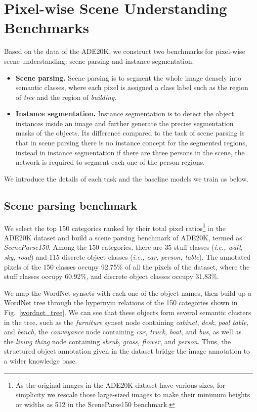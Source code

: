 \section{Pixel-wise Scene Understanding Benchmarks}
\label{section:benchmarks}
Based on the data of the ADE20K, we construct two benchmarks for pixel-wise scene understanding: scene parsing and instance segmentation:

\begin{itemize}
\item \textbf{Scene parsing.} Scene parsing is to segment the whole image densely into semantic classes, where each pixel is assigned a class label such as the region of \textit{tree} and the region of \textit{building}. 

\item \textbf{Instance segmentation.} Instance segmentation is to detect the object instances inside an image and further generate the precise segmentation masks of the objects. Its difference compared to the task of scene parsing is that in scene parsing there is no instance concept for the segmented regions, instead in instance segmentation if there are three persons in the scene, the network is required to segment each one of the person regions.
\end{itemize}

We introduce the details of each task and the baseline models we train as below.

\subsection{Scene parsing benchmark}

We select the top 150 categories ranked by their total pixel ratios\footnote{As the original images in the ADE20K dataset have various sizes, for simplicity we rescale those large-sized images to make their minimum heights or widths as 512 in the SceneParse150 benchmark.} in the ADE20K dataset and build a scene parsing benchmark of ADE20K, termed as \textit{SceneParse150}. Among the 150 categories, there are 35 stuff classes (\textit{i.e., wall, sky, road}) and 115 discrete object classes (\textit{i.e., car, person, table}). The annotated pixels of the 150 classes occupy 92.75\% of all the pixels of the dataset, where the stuff classes occupy 60.92\%, and discrete object classes occupy 31.83\%.

We map the WordNet synsets with each one of the object names, then build up a WordNet tree through the hypernym relations of the 150 categories shown in Fig.~\ref{wordnet_tree}. We can see that these objects form several semantic clusters in the tree, such as the \textit{furniture} synset node containing \textit{cabinet}, \textit{desk}, \textit{pool table}, and \textit{bench}, the \textit{conveyance} node containing \textit{car}, \textit{truck}, \textit{boat}, and \textit{bus}, as well as the \textit{living thing} node containing \textit{shrub}, \textit{grass}, \textit{flower}, and \textit{person}. Thus, the structured object annotation given in the dataset bridge the image annotation to a wider knowledge base. 

